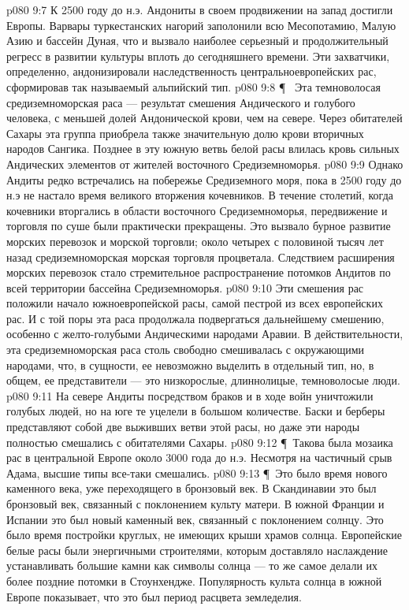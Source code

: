 \vs p080 9:7 К 2500 году до н.э. Андониты в своем продвижении на запад достигли Европы. Варвары туркестанских нагорий заполонили всю Месопотамию, Малую Азию и бассейн Дуная, что и вызвало наиболее серьезный и продолжительный регресс в развитии культуры вплоть до сегодняшнего времени. Эти захватчики, определенно, андонизировали наследственность центральноевропейских рас, сформировав так называемый альпийский тип.
\vs p080 9:8 \P\ \bibnobreakspace {} Эта темноволосая средиземноморская раса --- результат смешения Андического и голубого человека, с меньшей долей Андонической крови, чем на севере. Через обитателей Сахары эта группа приобрела также значительную долю крови вторичных народов Сангика. Позднее в эту южную ветвь белой расы влилась кровь сильных Андических элементов от жителей восточного Средиземноморья.
\vs p080 9:9 Однако Андиты редко встречались на побережье Средиземного моря, пока в 2500 году до н.э не настало время великого вторжения кочевников. В течение столетий, когда кочевники вторгались в области восточного Средиземноморья, передвижение и торговля по суше были практически прекращены. Это вызвало бурное развитие морских перевозок и морской торговли; около четырех с половиной тысяч лет назад средиземноморская морская торговля процветала. Следствием расширения морских перевозок стало стремительное распространение потомков Андитов по всей территории бассейна Средиземноморья.
\vs p080 9:10 Эти смешения рас положили начало южноевропейской расы, самой пестрой из всех европейских рас. И с той поры эта раса продолжала подвергаться дальнейшему смешению, особенно с желто\hyp{}голубыми Андическими народами Аравии. В действительности, эта средиземноморская раса столь свободно смешивалась с окружающими народами, что, в сущности, ее невозможно выделить в отдельный тип, но, в общем, ее представители --- это низкорослые, длиннолицые, темноволосые люди.
\vs p080 9:11 На севере Андиты посредством браков и в ходе войн уничтожили голубых людей, но на юге те уцелели в большом количестве. Баски и берберы представляют собой две выживших ветви этой расы, но даже эти народы полностью смешались с обитателями Сахары.
\vs p080 9:12 \P\ Такова была мозаика рас в центральной Европе около 3000 года до н.э. Несмотря на частичный срыв Адама, высшие типы все\hyp{}таки смешались.
\vs p080 9:13 \P\ Это было время нового каменного века, уже переходящего в бронзовый век. В Скандинавии это был бронзовый век, связанный с поклонением культу матери. В южной Франции и Испании это был новый каменный век, связанный с поклонением солнцу. Это было время постройки круглых, не имеющих крыши храмов солнца. Европейские белые расы были энергичными строителями, которым доставляло наслаждение устанавливать большие камни как символы солнца --- то же самое делали их более поздние потомки в Стоунхендже. Популярность культа солнца в южной Европе показывает, что это был период расцвета земледелия.
